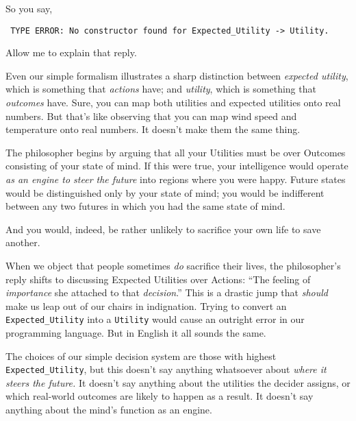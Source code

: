 {{
 So you say,}

\texttt{
 TYPE ERROR: No constructor found for Expected\_Utility
-{\textgreater} Utility.}

{
 Allow me to explain that reply.}

{
 Even our simple formalism illustrates a sharp distinction between
\textit{expected utility}, which is something that \textit{actions}
have; and \textit{utility}, which is something that \textit{outcomes}
have. Sure, you can map both utilities and expected utilities onto real
numbers. But that's like observing that you can map
wind speed and temperature onto real numbers. It
doesn't make them the same thing.}

{
 The philosopher begins by arguing that all your Utilities must be
over Outcomes consisting of your state of mind. If this were true, your
intelligence would operate \textit{as an engine to steer the future}
into regions where you were happy. Future states would be distinguished
only by your state of mind; you would be indifferent between any two
futures in which you had the same state of mind.}

{
 And you would, indeed, be rather unlikely to sacrifice your own
life to save another.}

{
 When we object that people sometimes \textit{do} sacrifice their
lives, the philosopher's reply shifts to discussing
Expected Utilities over Actions: ``The feeling of
\textit{importance} she attached to that
\textit{decision}.'' This is a drastic jump that
\textit{should} make us leap out of our chairs in indignation. Trying
to convert an \texttt{Expected\_Utility} into a \texttt{Utility} would cause an outright
error in our programming language. But in English it all sounds the
same.}

{
 The choices of our simple decision system are those with highest
\texttt{Expected\_Utility}, but this doesn't say anything
whatsoever about \textit{where it steers the future.} It
doesn't say anything about the utilities the decider
assigns, or which real-world outcomes are likely to happen as a result.
It doesn't say anything about the
mind's function as an engine.}

}
